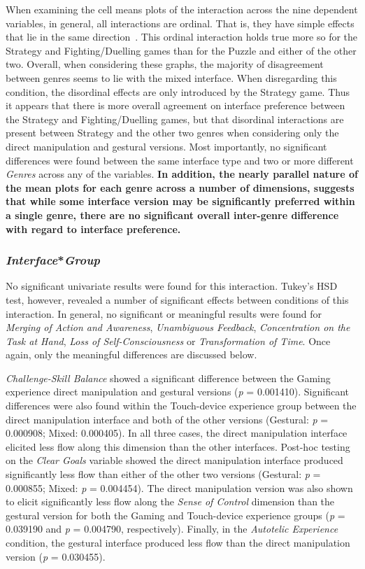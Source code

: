 When examining the cell means plots of the interaction across the nine dependent variables, in general, all interactions are ordinal. That is, they have simple effects that lie in the same direction~\citep{Tred02}. This ordinal interaction holds true more so for the Strategy and Fighting/Duelling games than for the Puzzle and either of the other two. Overall, when considering these graphs, the majority of disagreement between genres seems to lie with the mixed interface. When disregarding this condition, the disordinal effects are only introduced by the Strategy game. Thus it appears that there is more overall agreement on interface preference between the Strategy and Fighting/Duelling games, but that disordinal interactions are present between Strategy and the other two genres when considering only the direct manipulation and gestural versions. Most importantly, no significant differences were found between the same interface type and two or more different \emph{Genres} across any of the variables. {\bf In addition, the nearly parallel nature of the mean plots for each genre across a number of dimensions, suggests that while some interface version may be significantly preferred within a single genre, there are no significant overall inter-genre difference with regard to interface preference.}


\subsubsection{\emph{Interface}*\emph{Group}}
No significant univariate results were found for this interaction. Tukey's HSD test, however, revealed a number of significant effects between conditions of this interaction. In general, no significant or meaningful results were found for \emph{Merging of Action and Awareness}, \emph{Unambiguous Feedback}, \emph{Concentration on the Task at Hand}, \emph{Loss of Self-Consciousness} or \emph{Transformation of Time}. Once again, only the meaningful differences are discussed below.

\emph{Challenge-Skill Balance} showed a significant difference between the Gaming experience direct manipulation and gestural versions (\emph{p} = 0.001410). Significant differences were also found within the Touch-device experience group between the direct manipulation interface and both of the other versions (Gestural: \emph{p} = 0.000908; Mixed: 0.000405). In all three cases, the direct manipulation interface elicited less flow along this dimension than the other interfaces. Post-hoc testing on the \emph{Clear Goals} variable showed the direct manipulation interface produced significantly less flow than either of the other two versions (Gestural: \emph{p} = 0.000855; Mixed: \emph{p} = 0.004454). The direct manipulation version was also shown to elicit significantly less flow along the \emph{Sense of Control} dimension than the gestural version for both the Gaming and Touch-device experience groups (\emph{p} = 0.039190 and \emph{p} = 0.004790, respectively). Finally, in the \emph{Autotelic Experience} condition, the gestural interface produced less flow than the direct manipulation version (\emph{p} = 0.030455).

